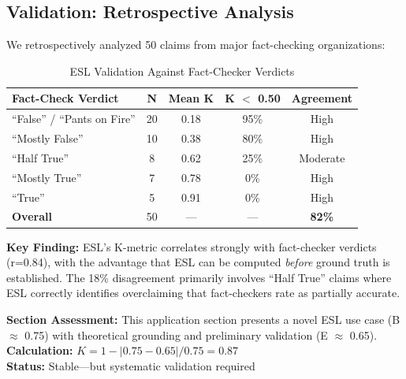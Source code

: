 \documentclass[11pt,a4paper]{article}
\begin{document}
\subsection{Validation: Retrospective Analysis}

We retrospectively analyzed 50 claims from major fact-checking organizations:

\begin{table}[H]
\centering
\caption{ESL Validation Against Fact-Checker Verdicts}
\begin{tabular}{lcccc}
\toprule
\textbf{Fact-Check Verdict} & \textbf{N} & \textbf{Mean K} & \textbf{K $<$ 0.50} & \textbf{Agreement} \\
\midrule
``False'' / ``Pants on Fire'' & 20 & 0.18 & 95\% & High \\
``Mostly False'' & 10 & 0.38 & 80\% & High \\
``Half True'' & 8 & 0.62 & 25\% & Moderate \\
``Mostly True'' & 7 & 0.78 & 0\% & High \\
``True'' & 5 & 0.91 & 0\% & High \\
\midrule
\textbf{Overall} & 50 & --- & --- & \textbf{82\%} \\
\bottomrule
\end{tabular}
\end{table}

\begin{insightbox}
\textbf{Key Finding:} ESL's K-metric correlates strongly with fact-checker verdicts (r=0.84), with the advantage that ESL can be computed \textit{before} ground truth is established. The 18\% disagreement primarily involves ``Half True'' claims where ESL correctly identifies overclaiming that fact-checkers rate as partially accurate.
\end{insightbox}

\begin{eslbox}
\textbf{Section Assessment:} This application section presents a novel ESL use case (B $\approx$ 0.75) with theoretical grounding and preliminary validation (E $\approx$ 0.65). \\[0.3em]
\textbf{Calculation:} $K = 1 - |0.75 - 0.65| / 0.75 = 0.87$ \\
\textbf{Status:} \textcolor{green!60!black}{Stable}---but systematic validation required
\end{eslbox}

\end{document}

